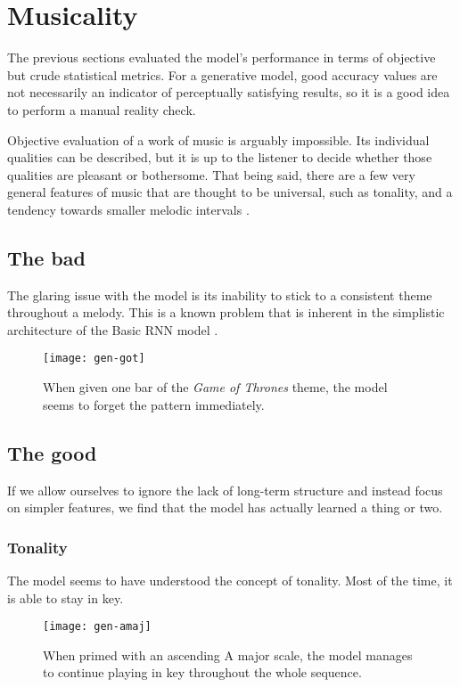 \documentclass[../../report.tex]{subfiles}
\begin{document}
\section{Musicality}

The previous sections evaluated the model's performance in terms of objective
but crude statistical metrics. For a generative model, good accuracy values are
not necessarily an indicator of perceptually satisfying results, so it is a good
idea to perform a manual reality check.

Objective evaluation of a work of music is arguably impossible. Its individual
qualities can be described, but it is up to the listener to decide whether those
qualities are pleasant or bothersome. That being said, there are a few very
general features of music that are thought to be universal, such as tonality,
and a tendency towards smaller melodic intervals \cite{Mehr2019}.

\subsection{The bad}

The glaring issue with the model is its inability to stick to a consistent theme
throughout a melody. This is a known problem that is inherent in the simplistic
architecture of the Basic RNN model \cite{Abolafia2016}.

\begin{figure}[h]
  \texttt{[image: gen-got]}
  \caption{When given one bar of the \emph{Game of Thrones} theme, the model
  seems to forget the pattern immediately.}
\end{figure}

\subsection{The good}

If we allow ourselves to ignore the lack of long-term structure and instead
focus on simpler features, we find that the model has actually learned a thing
or two.

\subsubsection{Tonality}
The model seems to have understood the concept of tonality. Most of the time, it
is able to stay in key.

\begin{figure}[h]
  \texttt{[image: gen-amaj]}
  \caption{When primed with an ascending A major scale, the model manages to
  continue playing in key throughout the whole sequence.}
\end{figure}
\end{document}
